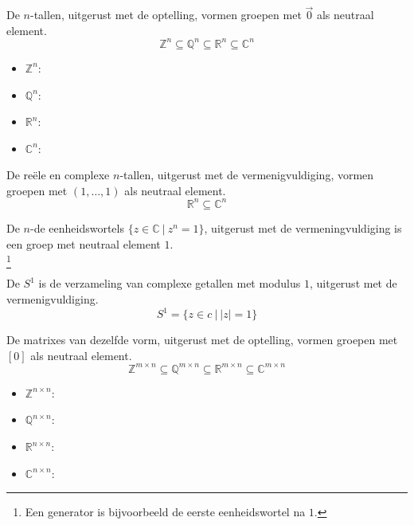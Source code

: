 \documentclass[main.tex]{subfiles}
\begin{document}
\begin{vb}
  De $n$-tallen, uitgerust met de optelling, vormen groepen met $\vec{0}$ als neutraal element.
  \[ \mathbb{Z}^{n} \subseteq \mathbb{Q}^{n} \subseteq \mathbb{R}^{n} \subseteq \mathbb{C}^{n} \]
  \begin{itemize}
  \item $\mathbb{Z}^{n}$: 
  \item $\mathbb{Q}^{n}$: \cycln
  \item $\mathbb{R}^{n}$: \cycln
  \item $\mathbb{C}^{n}$: \cycln
  \end{itemize}
\commj
\end{vb}

\begin{vb}
  De re\"ele en complexe $n$-tallen, uitgerust met de vermenigvuldiging, vormen groepen met $(1,\dotsc,1)$ als neutraal element.
  \[ \mathbb{R}^{n} \subseteq \mathbb{C}^{n} \]
\commj \cycln
\end{vb}

\begin{vb}
  De $n$-de eenheidswortels $\{ z \in \mathbb{C}\ |\ z^{n} = 1 \}$, uitgerust met de vermeningvuldiging is een groep met neutraal element $1$.\\
\commj {}\footnote{Een generator is bijvoorbeeld de eerste eenheidswortel na $1$.}
\end{vb}

\begin{de}
  De  $S^{1}$ is de verzameling van complexe getallen met modulus $1$, uitgerust met de vermenigvuldiging.
  \[ S^{1} = \{ z \in c\ |\ |z| = 1 \} \]
\commj \cycln
\end{de}

\begin{vb}
  De matrixes van dezelfde vorm, uitgerust met de optelling, vormen groepen met $[0]$ als neutraal element.
  \[ \mathbb{Z}^{m \times n} \subseteq \mathbb{Q}^{m \times n} \subseteq \mathbb{R}^{m \times n} \subseteq \mathbb{C}^{m \times n} \]
  \begin{itemize}
  \item $\mathbb{Z}^{n \times n}$: 
  \item $\mathbb{Q}^{n \times n}$: \cycln
  \item $\mathbb{R}^{n \times n}$: \cycln
  \item $\mathbb{C}^{n \times n}$: \cycln
  \end{itemize}
\commn
\end{vb}
\end{document}
